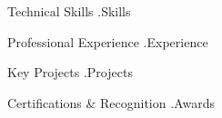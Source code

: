 \documentclass{resume}
\begin{document}
\introduction[
    fullname={ {{.FullName}} },
    email={ {{.Email}} },
    phone={ {{.Phone}} },
    linkedin={ {{.LinkedIn}} },
    github={ {{.GitHub}} }
]


\begin{skillsSection}{Technical Skills}
    {{.Skills}}
\end{skillsSection}

\begin{experienceSection}{Professional Experience}
    {{.Experience}}
\end{experienceSection}

\begin{experienceSection}{Key Projects}
    {{.Projects}}
\end{experienceSection}

\begin{skillsSection}{Certifications \& Recognition}
    {{.Awards}}
\end{skillsSection}
\end{document}
